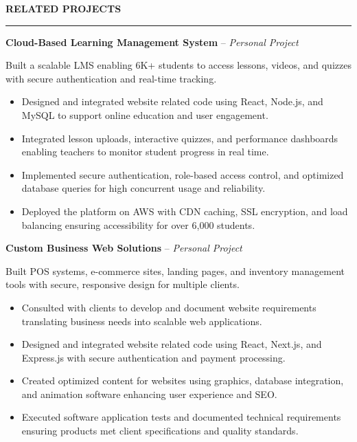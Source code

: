 \documentclass[10pt,letterpaper]{article}
\begin{document}
\vspace{6pt}

\textbf{RELATED PROJECTS}\\[-8pt]
\noindent\rule{\textwidth}{1pt}

\vspace{-2pt}

\textbf{Cloud-Based Learning Management System} -- \emph{Personal Project}

\vspace{-1pt}

Built a scalable LMS enabling 6K+ students to access lessons, videos, and quizzes with secure authentication and real-time tracking.
\vspace{-1pt}
\begin{itemize}
\item Designed and integrated website related code using React, Node.js, and MySQL to support online education and user engagement.
\item Integrated lesson uploads, interactive quizzes, and performance dashboards enabling teachers to monitor student progress in real time.
\item Implemented secure authentication, role-based access control, and optimized database queries for high concurrent usage and reliability.
\item Deployed the platform on AWS with CDN caching, SSL encryption, and load balancing ensuring accessibility for over 6,000 students.
\end{itemize}

\textbf{Custom Business Web Solutions} -- \emph{Personal Project}

\vspace{-1pt}

Built POS systems, e-commerce sites, landing pages, and inventory management tools with secure, responsive design for multiple clients.
\vspace{-1pt}
\begin{itemize}
\item Consulted with clients to develop and document website requirements translating business needs into scalable web applications.
\item Designed and integrated website related code using React, Next.js, and Express.js with secure authentication and payment processing.
\item Created optimized content for websites using graphics, database integration, and animation software enhancing user experience and SEO.
\item Executed software application tests and documented technical requirements ensuring products met client specifications and quality standards.
\end{itemize}
\end{document}

